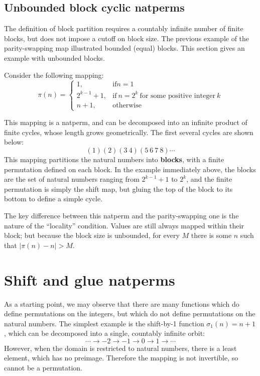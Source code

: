 \documentclass[12pt,reqno]{article}
\begin{document}
\subsection{Unbounded block cyclic natperms}

The definition of block partition requires a countably infinite number of finite blocks, but does not impose a cutoff on block size. The previous example of the parity-swapping map illustrated bounded (equal) blocks. This section gives an example with unbounded blocks. 

Consider the following mapping:
\begin{equation}
    \pi(n) = \begin{cases}
        1, & \text{if} n = 1 \\
        2^{k-1} + 1, & \text{if}\ n = 2^k \ \text{for some positive integer}\ k \\
        n + 1, & \text{otherwise}
    \end{cases}
\end{equation}

This mapping is a natperm, and can be decomposed into an infinite product of finite cycles, whose length grows geometrically. The first several cycles are shown below:
$$ (1)(2)(3 \ 4)(5 \ 6 \ 7 \ 8)\cdots $$ 
This mapping partitions the natural numbers into \textbf{blocks}, with a finite permutation defined on each block. In the example immediately above, the blocks are the set of natural numbers ranging from $2^{k-1} + 1$ to $2^k$, and the finite permutation is simply the shift map, but gluing the top of the block to its bottom to define a simple cycle.

The key difference between this natperm and the parity-swapping one is the nature of the ``locality'' condition. Values are still always mapped within their block; but because the block size is unbounded, for every $M$ there is some $n$ such that $|\pi(n) - n| > M$.

\section{Shift and glue natperms}

As a starting point, we may observe that there are many functions which do define permutations on the integers, but which do not define permutations on the natural numbers. The simplest example is the shift-by-1 function $\sigma_1(n) = n + 1$, which can be decomposed into a single, countably infinite orbit:
$$ \cdots \rightarrow -2 \rightarrow -1 \rightarrow 0 \rightarrow 1 \rightarrow \cdots $$
However, when the domain is restricted to natural numbers, there is a least element, which has no preimage. Therefore the mapping is not invertible, so cannot be a permutation.
\end{document}
